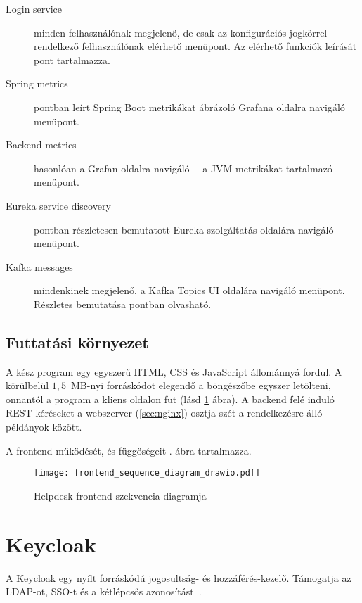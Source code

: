 \begin{description}
	\bigskip
	\item[Login service] minden felhasználónak megjelenő, de csak az konfigurációs jogkörrel rendelkező felhasználónak elérhető menüpont. Az elérhető funkciók leírását  pont tartalmazza.
	
	\item[Spring metrics]  pontban leírt Spring Boot metrikákat ábrázoló Grafana oldalra navigáló menüpont.
	
	\item[Backend metrics] hasonlóan a Grafan oldalra navigáló --~a JVM metrikákat tartalmazó~-- menüpont.

	\item[Eureka service discovery]  pontban részletesen bemutatott Eureka szolgáltatás oldalára navigáló menüpont. 
	
	\item[Kafka messages] mindenkinek megjelenő, a Kafka Topics UI oldalára navigáló menüpont. Részletes bemutatása  pontban olvasható.
	
\end{description}


\subsection{Futtatási környezet}
A kész program egy egyszerű HTML, CSS és JavaScript állománnyá fordul. A körülbelül $1,5$~MB-nyi forráskódot elegendő a böngészőbe egyszer letölteni, onnantól a program a kliens oldalon fut (lásd \ref{fig:frontend_sequence_diagram} ábra). A backend felé induló REST kéréseket a webszerver (\ref{sec:nginx}) osztja szét a rendelkezésre álló példányok között.

A frontend működését, és függőségeit . ábra tartalmazza.

\begin{figure}[hbp] 
	\centering
	\texttt{[image: frontend\_sequence\_diagram\_drawio.pdf]}
	\caption{Helpdesk frontend szekvencia diagramja}
	\label{fig:frontend_sequence_diagram}
\end{figure}

\pagebreak
\section{Keycloak}\label{sec:keycloak}
A Keycloak egy nyílt forráskódú jogosultság- és hozzáférés-kezelő. Támogatja az LDAP-ot, SSO-t és a kétlépcsős azonosítást~\cite{Keycloak_website}. 

